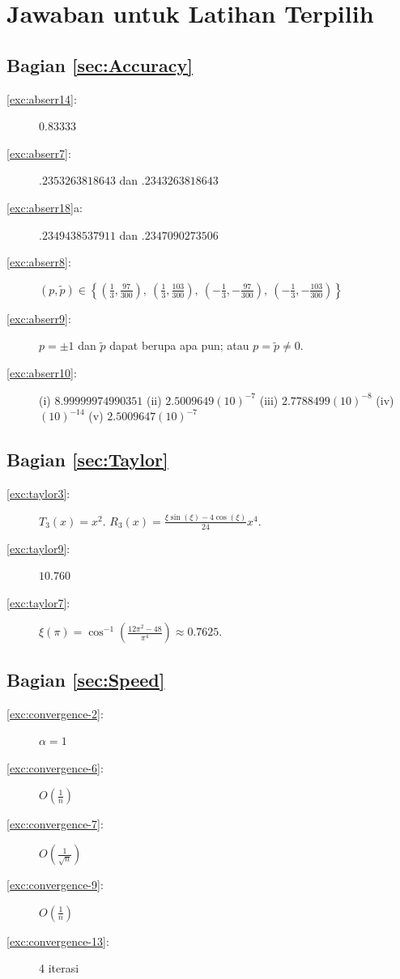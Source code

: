 
\chapter*{Jawaban untuk Latihan Terpilih}

\section*{Bagian \ref{sec:Accuracy}}

\fancyhead[LO]{}
\begin{description}
\item [{\ref{exc:abserr14}:}] $0.83333$
\item [{\ref{exc:abserr7}:}] $.2353263818643$ dan $.2343263818643$
\item [{\ref{exc:abserr18}a:}] $.2349438537911$ dan $.2347090273506$
\item [{\ref{exc:abserr8}:}] $(p,\tilde{p})\in\left\{ \left(\frac{1}{3},\frac{97}{300}\right),\ \left(\frac{1}{3},\frac{103}{300}\right),\ \left(-\frac{1}{3},-\frac{97}{300}\right),\ \left(-\frac{1}{3},-\frac{103}{300}\right)\right\} $
\item [{\ref{exc:abserr9}:}] $p=\pm1$ dan $\tilde{p}$ dapat berupa apa
pun; atau $p=\tilde{p}\neq0$.
\item [{\ref{exc:abserr10}:}] (i) $8.99999974990351$ (ii) $2.5009649(10)^{-7}$
(iii) $2.7788499(10)^{-8}$ (iv) $(10)^{-14}$ (v) $2.5009647(10)^{-7}$
\end{description}

\section*{Bagian \ref{sec:Taylor}}
\begin{description}
\item [{\ref{exc:taylor3}:}] $T_{3}(x)=x^{2}$. $R_{3}(x)=\frac{\xi\sin(\xi)-4\cos(\xi)}{24}x^{4}$.
\item [{\ref{exc:taylor9}:}] $10.760$
\item [{\ref{exc:taylor7}:}] $\xi(\pi)=\cos^{-1}\left(\frac{12\pi^{2}-48}{\pi^{4}}\right)\approx0.7625$.
\end{description}

\section*{Bagian \ref{sec:Speed}}
\begin{description}
\item [{\ref{exc:convergence-2}:}] $\alpha=1$
\item [{\ref{exc:convergence-6}:}] $O\left(\frac{1}{n}\right)$
\item [{\ref{exc:convergence-7}:}] $O\left(\frac{1}{\sqrt{n}}\right)$
\item [{\ref{exc:convergence-9}:}] $O\left(\frac{1}{n}\right)$
\item [{\ref{exc:convergence-13}:}] 4 iterasi
\end{description}

